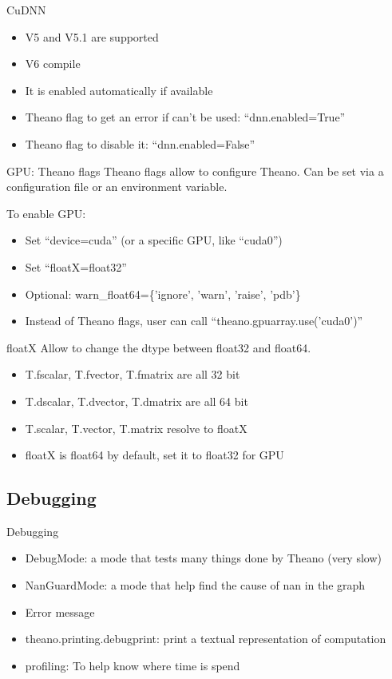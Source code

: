 \documentclass[utf8x,xcolor=pdftex,dvipsnames,table]{beamer}
\begin{document}
\begin{frame}{CuDNN}
  \begin{itemize}
  \item V5 and V5.1 are supported
  \item V6 compile
  \item It is enabled automatically if available
  \item Theano flag to get an error if can't be used: ``dnn.enabled=True''
  \item Theano flag to disable it: ``dnn.enabled=False''
  \end{itemize}
\end{frame}


\begin{frame}{GPU: Theano flags}
  Theano flags allow to configure Theano. Can be set via a
  configuration file or an environment variable.

  To enable GPU:
  \begin{itemize}
  \item Set ``device=cuda'' (or a specific GPU, like ``cuda0'')
  \item Set ``floatX=float32''
  \item Optional: warn\_float64=\{'ignore', 'warn', 'raise', 'pdb'\}
  \item Instead of Theano flags, user can call ``theano.gpuarray.use('cuda0')''
  \end{itemize}
\end{frame}


\begin{frame}{floatX}
  Allow to change the dtype between float32 and float64.
  \begin{itemize}
  \item T.fscalar, T.fvector, T.fmatrix are all 32 bit
  \item T.dscalar, T.dvector, T.dmatrix are all 64 bit
  \item T.scalar, T.vector, T.matrix resolve to floatX
  \item floatX is float64 by default, set it to float32 for GPU
  \end{itemize}
\end{frame}

\subsection{Debugging}
\begin{frame}{Debugging}
  \begin{itemize}
  \item DebugMode: a mode that tests many things done by Theano (very slow)
  \item NanGuardMode: a mode that help find the cause of nan in the graph
  \item Error message
  \item theano.printing.debugprint: print a textual representation of computation
  \item profiling: To help know where time is spend
  \end{itemize}
\end{frame}
\end{document}
